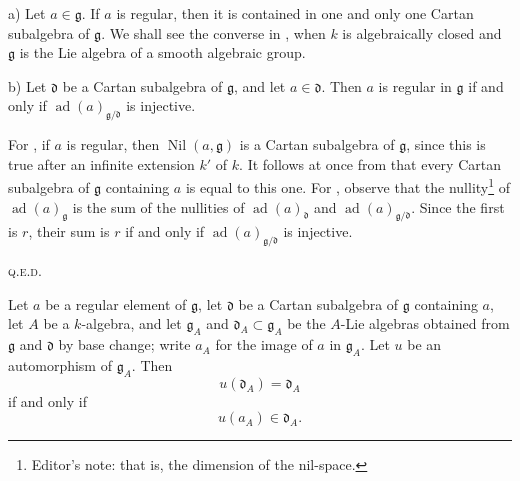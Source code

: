 \begin{proposition}
\textup{a)} Let \(a\in\mathfrak g\). If \(a\) is regular, then it is
contained in one and only one Cartan subalgebra of \(\mathfrak g\).
We shall see the converse in , when \(k\) is algebraically
closed and \(\mathfrak g\) is the Lie algebra of a smooth algebraic
group.

\textup{b)} Let \(\mathfrak d\) be a Cartan subalgebra of
\(\mathfrak g\), and let \(a\in\mathfrak d\). Then \(a\) is regular
in \(\mathfrak g\) if and only if
\(\operatorname{ad}(a)_{\mathfrak g/\mathfrak d}\) is injective.
\end{proposition}

For , if \(a\) is regular, then
\(\operatorname{Nil}(a,\mathfrak g)\) is a Cartan subalgebra of
\(\mathfrak g\), since this is true after an infinite extension
\(k'\) of \(k\). It follows at once from  that every Cartan
subalgebra of \(\mathfrak g\) containing \(a\) is equal to this one.
For , observe that the nullity\footnote{Editor's note: that is, the
dimension of the nil-space.} of
\(\operatorname{ad}(a)_{\mathfrak g}\) is the sum of the nullities of
\(\operatorname{ad}(a)_{\mathfrak d}\) and
\(\operatorname{ad}(a)_{\mathfrak g/\mathfrak d}\). Since the first
is \(r\), their sum is \(r\) if and only if
\(\operatorname{ad}(a)_{\mathfrak g/\mathfrak d}\) is injective.
\par\hfill\textsc{q.e.d.}

\begin{corollary}
Let \(a\) be a regular element of \(\mathfrak g\), let
\(\mathfrak d\) be a Cartan subalgebra of \(\mathfrak g\) containing
\(a\), let \(A\) be a \(k\)-algebra, and let
\(\mathfrak g_A\) and \(\mathfrak d_A\subset\mathfrak g_A\) be the
\(A\)-Lie algebras obtained from \(\mathfrak g\) and \(\mathfrak d\)
by base change; write \(a_A\) for the image of \(a\) in
\(\mathfrak g_A\). Let \(u\) be an automorphism of
\(\mathfrak g_A\). Then
\[
  u(\mathfrak d_A)=\mathfrak d_A
\]
if and only if
\[
  u(a_A)\in\mathfrak d_A.
\]
\end{corollary}


